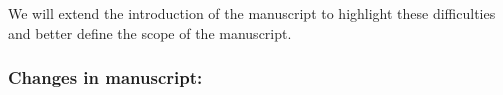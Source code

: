 We will extend the introduction of the manuscript to highlight these difficulties
and better define the scope of the manuscript.

%
%

\subsubsection{Changes in manuscript:}

